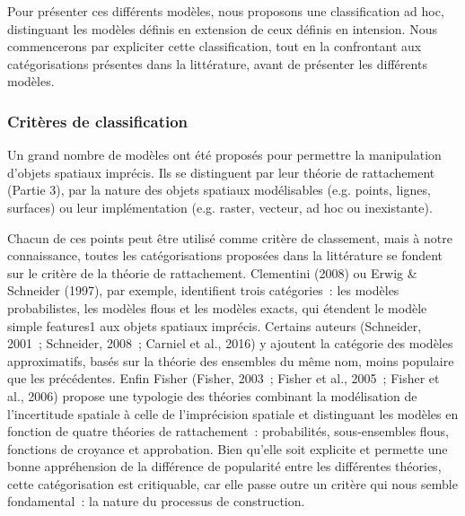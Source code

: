 Pour présenter ces différents modèles, nous proposons une
classification ad hoc, distinguant les modèles définis en extension
de ceux définis en intension. Nous commencerons par expliciter cette
classification, tout en la confrontant aux catégorisations présentes
dans la littérature, avant de présenter les différents modèles.

\subsubsection{Critères de classification}

Un grand nombre de modèles ont été proposés pour permettre la
manipulation d’objets spatiaux imprécis. Ils se distinguent par leur
théorie de rattachement (Partie 3), par la nature des objets spatiaux
modélisables (e.g. points, lignes, surfaces) ou leur implémentation
(e.g. raster, vecteur, ad hoc ou inexistante).

Chacun de ces points peut être utilisé comme critère de classement,
mais à notre connaissance, toutes les catégorisations proposées dans
la littérature se fondent sur le critère de la théorie de
rattachement. Clementini (2008) ou Erwig \& Schneider (1997), par
exemple, identifient trois catégories : les modèles probabilistes, les
modèles flous et les modèles exacts, qui étendent le modèle simple
features1 aux objets spatiaux imprécis. Certains auteurs (Schneider,
2001 ; Schneider, 2008 ; Carniel et al., 2016) y ajoutent la catégorie
des modèles approximatifs, basés sur la théorie des ensembles du même
nom, moins populaire que les précédentes. Enfin Fisher (Fisher, 2003 ;
Fisher et al., 2005 ; Fisher et al., 2006) propose une typologie des
théories combinant la modélisation de l’incertitude spatiale à celle
de l’imprécision spatiale et distinguant les modèles en fonction de
quatre théories de rattachement : probabilités, sous-ensembles flous,
fonctions de croyance et approbation. Bien qu’elle soit explicite et
permette une bonne appréhension de la différence de popularité entre
les différentes théories, cette catégorisation est critiquable, car
elle passe outre un critère qui nous semble fondamental : la nature du
processus de construction.

